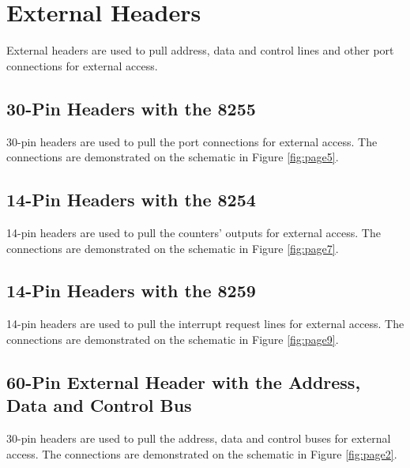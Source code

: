 \section{External Headers}
External headers are used to pull address, data and control lines and other port connections for external access.

    \subsection{30-Pin Headers with the 8255}
    30-pin headers are used to pull the port connections for external access. The connections are demonstrated on the schematic in Figure \ref{fig:page5}.

    \subsection{14-Pin Headers with the 8254}
    14-pin headers are used to pull the counters' outputs for external access. The connections are demonstrated on the schematic in Figure \ref{fig:page7}.

    \subsection{14-Pin Headers with the 8259}
    14-pin headers are used to pull the interrupt request lines for external access. The connections are demonstrated on the schematic in Figure \ref{fig:page9}.

    \subsection{60-Pin External Header with the Address, Data and Control Bus}
    30-pin headers are used to pull the address, data and control buses for external access. The connections are demonstrated on the schematic in Figure \ref{fig:page2}.

